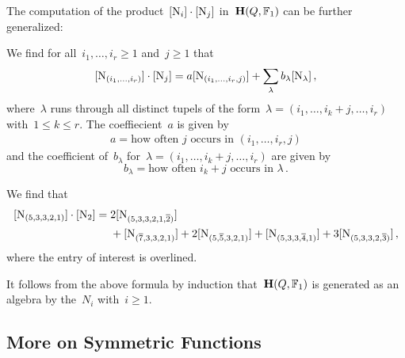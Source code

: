 \documentclass[a4paper,11pt]{scrartcl}
\begin{document}
The computation of the product~$[\mathrm{N}_i] \cdot [\mathrm{N}_j]$ in~$\mathbf{H}(Q, \mathbb{F}_1)$ can be further generalized:

We find for all~$i_1, \dotsc, i_r \geq 1$ and~$j \geq 1$ that
\[
  [ \mathrm{N}_{(i_1, \dotsc, i_r)} ] \cdot [ \mathrm{N}_j ]
  =
  a [ \mathrm{N}_{(i_1, \dotsc, i_r, j)} ]
  +
  \sum_{\lambda} b_\lambda [ \mathrm{N}_\lambda ] \,,
\]
where~$\lambda$ runs through all distinct tupels of the form~$\lambda = (i_1, \dotsc, i_k + j, \dotsc, i_r)$ with~$1 \leq k \leq r$.
The coeffiecient~$a$ is given by
\begin{align*}
  a
  =
  \text{how often~$j$ occurs in~$(i_1, \dotsc, i_r, j)$}
\end{align*}
and the coefficient of~$b_\lambda$ for~$\lambda = (i_1, \dotsc, i_k + j, \dotsc, i_r)$ are given by
\[
  b_\lambda
  =
  \text{how often~$i_k + j$ occurs in~$\lambda$} \,.
\]

\begin{example}
  We find that 
  \begin{align*}
    [ \mathrm{N}_{(5, 3, 3, 2, 1)} ] \cdot [ \mathrm{N}_2 ]
    ={}&
      2 [ \mathrm{N}_{(5, 3, 3, 2, 1, \overline{2})} ]
    \\
    {}&
    +   [ \mathrm{N}_{(\overline{7}, 3, 3, 2, 1)} ]
    + 2 [ \mathrm{N}_{(5, \overline{5}, 3, 2, 1)} ]
    +   [ \mathrm{N}_{(5, 3, 3, \overline{4}, 1)} ]
    + 3 [ \mathrm{N}_{(5, 3, 3, 2, \overline{3})} ] \,,
  \end{align*}
  where the entry of interest is overlined.
\end{example}

\begin{remark}
  \label{indecomposables generate hall algebra}
  It follows from the above formula by induction that~$\mathbf{H}(Q, \mathbb{F}_1)$ is generated as an algebra by the~$N_i$ with~$i \geq 1$.
\end{remark}



\subsection{More on Symmetric Functions}
\label{wrong symmetric functions}
\end{document}
